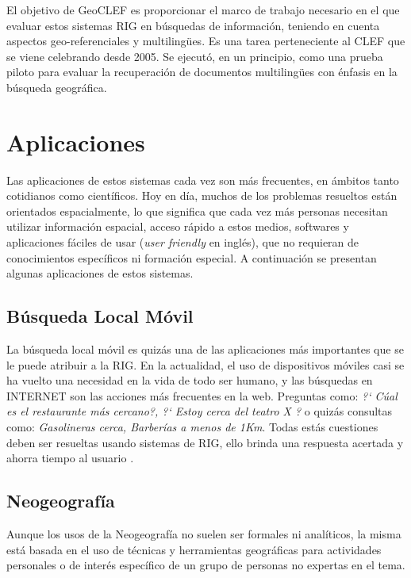 \documentclass{llncs}
\begin{document}
El objetivo de GeoCLEF es proporcionar el marco de trabajo necesario en el que
evaluar estos sistemas RIG en búsquedas de información, teniendo en cuenta
aspectos geo-referenciales y multiling\"ues. Es una tarea perteneciente al CLEF
que se viene celebrando desde 2005. Se ejecutó, en un principio, como una
prueba piloto para evaluar la recuperación de documentos multiling\"ues con
énfasis en la búsqueda geográfica.


\section{Aplicaciones}\label{sec:appl}

Las aplicaciones de estos sistemas cada vez son más frecuentes, en ámbitos
tanto cotidianos como científicos. Hoy en día, muchos de los problemas
resueltos están orientados espacialmente, lo que significa que cada vez más
personas necesitan utilizar información espacial, acceso rápido a estos medios,
softwares y aplicaciones fáciles de usar (\emph{user friendly} en inglés), que no
requieran de conocimientos específicos ni formación especial. A continuación
se presentan algunas aplicaciones de estos sistemas.

\subsection{Búsqueda Local Móvil}\label{sec:mobile}

La búsqueda local móvil es quizás una de las aplicaciones más importantes que
se le puede atribuir a la RIG. En la actualidad, el uso de dispositivos móviles
casi se ha vuelto una necesidad en la vida de todo ser humano, y las búsquedas
en INTERNET son las acciones más frecuentes en la web. Preguntas como: \emph{?`
Cúal es el restaurante más cercano?, ?` Estoy cerca del teatro X ?} o quizás
consultas como: \emph{Gasolineras cerca, Barberías a menos de 1Km}. Todas estás
cuestiones deben ser resueltas usando sistemas de RIG, ello brinda una
respuesta acertada y ahorra tiempo al usuario
\cite{teevan2011,lymberopoulos2011}. 

\subsection{Neogeografía}\label{sec:neogeo}

Aunque los usos de la Neogeografía no suelen ser formales ni analíticos, la
misma está basada en el uso de técnicas y herramientas geográficas para
actividades personales o de interés específico de un grupo de personas no
expertas en el tema.\cite{turner2006}
\end{document}
